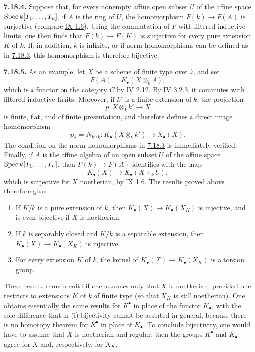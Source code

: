 \textbf{7.18.4.}
Suppose that, for every nonempty affine open subset $U$ of the affine space
$\operatorname{Spec} k[T_1,\ldots,T_n]$, if $A$ is the ring of $U$, the homomorphism
$F(k)\to F(A)$ is surjective (compare \hyperlink{sga6.e09.prop.1-6}{IX 1.6}). Using the commutation of $F$
with filtered inductive limits, one then finds that
$F(k)\to F(K)$ is surjective for every pure extension $K$ of $k$. If, in
addition, $k$ is infinite, or if norm homomorphisms can be defined as in
\hyperlink{sga6.e10.para.7-18-3}{7.18.3}, this homomorphism is therefore bijective.

\textbf{7.18.5.}
As an example, let $X$ be a scheme of finite type over $k$, and set
\[
F(A)=K_\bullet(X\otimes_k A),
\]
which is a functor on the category $C$ by \hyperlink{sga6.e04.para.2-12}{IV 2.12}. By \hyperlink{sga6.e04.para.3-2-3}{IV 3.2.3}, it commutes
with filtered inductive limits. Moreover, if $k'$ is a finite extension of
$k$, the projection
\[
p:X\otimes_k k'\longrightarrow X
\]
is finite, flat, and of finite presentation, and therefore defines a direct
image homomorphism
\[
p_*=N_{k'/k}:K_\bullet(X\otimes_k k')\longrightarrow K_\bullet(X).
\]
The condition on the norm homomorphisms in \hyperlink{sga6.e10.para.7-18-3}{7.18.3} is immediately verified.
Finally, if $A$ is the affine algebra of an open subset $U$ of the affine
space $\operatorname{Spec} k[T_1,\ldots,T_n]$, then $F(k)\to F(A)$ identifies with the map
\[
K_\bullet(X)\longrightarrow K_\bullet(X\times_k U),
\]
which is surjective for $X$ noetherian, by \hyperlink{sga6.e09.prop.1-6}{IX 1.6}. The results proved above
therefore give:
\begin{enumerate}[label=(\roman*)]
\item If $K/k$ is a pure extension of $k$, then
  $K_\bullet(X)\to K_\bullet(X_K)$ is injective, and is even bijective if
  $X$ is noetherian.
\item If $k$ is separably closed and $K/k$ is a separable extension, then
  $K_\bullet(X)\to K_\bullet(X_K)$ is injective.
\item For every extension $K$ of $k$, the kernel of
  $K_\bullet(X)\to K_\bullet(X_K)$ is a torsion group.
\end{enumerate}
These results remain valid if one assumes only that $X$ is noetherian,
provided one restricts to extensions $K$ of $k$ of finite type (so that
$X_K$ is still noetherian). One obtains essentially the same results for
$K^\bullet$ in place of the functor $K_\bullet$, with the sole difference
that in (i) bijectivity cannot be asserted in general, because there is no
homotopy theorem for $K^\bullet$ in place of $K_\bullet$. To conclude
bijectivity, one would have to assume that $X$ is noetherian and regular;
then the groups $K^\bullet$ and $K_\bullet$ agree for $X$ and, respectively,
for $X_K$.

